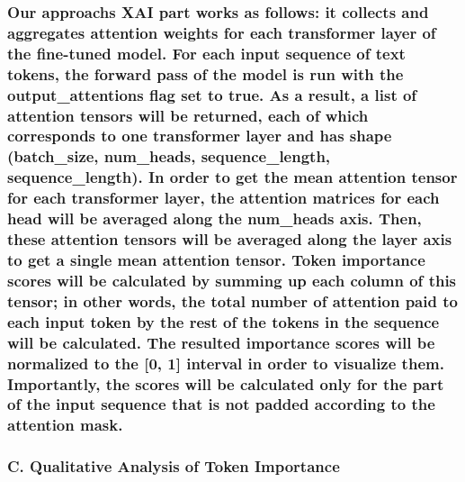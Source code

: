 \subsubsection{Our approach\textquotesingle s XAI part works as follows:
it collects and aggregates attention weights for each transformer layer
of the fine-tuned model. For each input sequence of text tokens, the
forward pass of the model is run with the output\_attentions flag set to
true. As a result, a list of attention tensors will be returned, each of
which corresponds to one transformer layer and has shape (batch\_size,
num\_heads, sequence\_length, sequence\_length). In order to get the
mean attention tensor for each transformer layer, the attention matrices
for each head will be averaged along the num\_heads axis. Then, these
attention tensors will be averaged along the layer axis to get a single
mean attention tensor. Token importance scores will be calculated by
summing up each column of this tensor; in other words, the total number
of attention paid to each input token by the rest of the tokens in the
sequence will be calculated. The resulted importance scores will be
normalized to the {[}0, 1{]} interval in order to visualize them.
Importantly, the scores will be calculated only for the part of the
input sequence that is not padded according to the attention
mask.}\label{our-approachs-xai-part-works-as-follows-it-collects-and-aggregates-attention-weights-for-each-transformer-layer-of-the-fine-tuned-model.-for-each-input-sequence-of-text-tokens-the-forward-pass-of-the-model-is-run-with-the-output_attentions-flag-set-to-true.-as-a-result-a-list-of-attention-tensors-will-be-returned-each-of-which-corresponds-to-one-transformer-layer-and-has-shape-batch_size-num_heads-sequence_length-sequence_length.-in-order-to-get-the-mean-attention-tensor-for-each-transformer-layer-the-attention-matrices-for-each-head-will-be-averaged-along-the-num_heads-axis.-then-these-attention-tensors-will-be-averaged-along-the-layer-axis-to-get-a-single-mean-attention-tensor.-token-importance-scores-will-be-calculated-by-summing-up-each-column-of-this-tensor-in-other-words-the-total-number-of-attention-paid-to-each-input-token-by-the-rest-of-the-tokens-in-the-sequence-will-be-calculated.-the-resulted-importance-scores-will-be-normalized-to-the-0-1-interval-in-order-to-visualize-them.-importantly-the-scores-will-be-calculated-only-for-the-part-of-the-input-sequence-that-is-not-padded-according-to-the-attention-mask.}

\subsubsection{C. Qualitative Analysis of Token
Importance}\label{c.-qualitative-analysis-of-token-importance}

